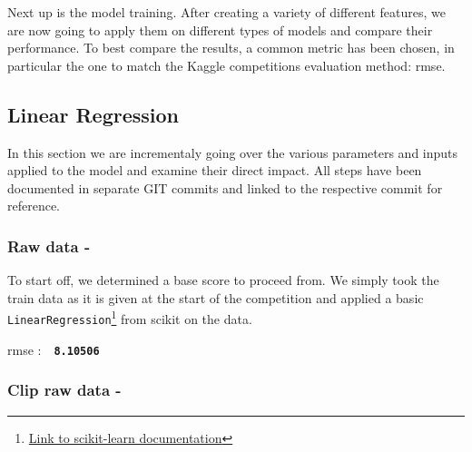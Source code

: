\newcommand{\rmse}[1]{
	\vspace*{-2mm}
	\begin{center}
		\begin{tcolorbox}[colback=white, colframe=iwiPurple, halign=flush center, width=0.8\linewidth, boxrule=1pt, arc=4mm]
				\Acrshort{rmse} :\ \ \textbf{\texttt{#1}}
		\end{tcolorbox}
	\end{center}
}


Next up is the model training. After creating a variety of different features, we are now going to apply them on different types of models and compare their performance. To best compare the results, a common metric has been chosen, in particular the one to match the Kaggle competitions evaluation method: \acrfull{rmse}.

\subsection{Linear Regression}

In this section we are incrementaly going over the various parameters and inputs applied to the model and examine their direct impact. All steps have been documented in separate GIT commits and linked to the respective commit for reference.

\subsubsection{Raw data - }

To start off, we determined a base score to proceed from. We simply took the train data as it is given at the start of the competition and applied a basic \texttt{LinearRegression}\footnote{\href{https://scikit-learn.org/stable/modules/generated/sklearn.linear_model.LinearRegression.html\#sklearn.linear_model.LinearRegression}{Link to scikit-learn documentation}} from \gls{scikit} on the data.
\rmse{8.10506}


\subsubsection{Clip raw data - }

